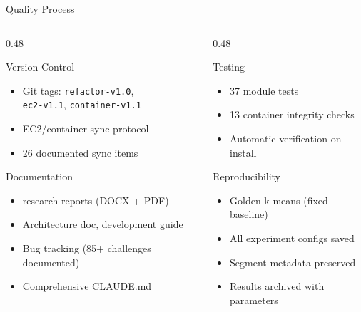 \begin{frame}[shrink=5]{Quality Process}
  \begin{columns}[T]
    \begin{column}{0.48\textwidth}
      \begin{block}{\small Version Control}
        \begin{itemize}\small
          \item Git tags: \texttt{refactor-v1.0},\\
                \texttt{ec2-v1.1}, \texttt{container-v1.1}
          \item EC2/container sync protocol
          \item 26 documented sync items
        \end{itemize}
      \end{block}

      \vspace{4pt}

      \begin{block}{\small Documentation}
        \begin{itemize}\small
          \item {} research reports (DOCX + PDF)
          \item Architecture doc, development guide
          \item Bug tracking (85+ challenges documented)
          \item Comprehensive CLAUDE.md
        \end{itemize}
      \end{block}
    \end{column}
    \begin{column}{0.48\textwidth}
      \begin{block}{\small Testing}
        \begin{itemize}\small
          \item 37 module tests
          \item 13 container integrity checks
          \item Automatic verification on install
        \end{itemize}
      \end{block}

      \vspace{4pt}

      \begin{block}{\small Reproducibility}
        \begin{itemize}\small
          \item Golden k-means (fixed baseline)
          \item All experiment configs saved
          \item Segment metadata preserved
          \item Results archived with parameters
        \end{itemize}
      \end{block}
    \end{column}
  \end{columns}


\end{frame}

